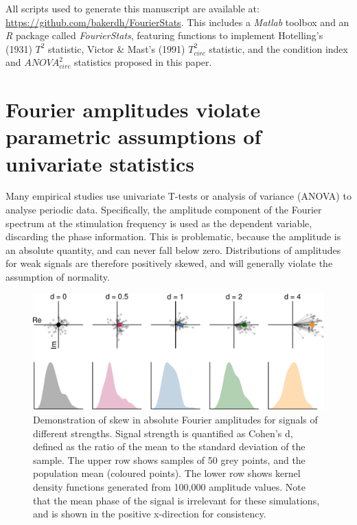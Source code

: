 \documentclass[]{article}
\begin{document}
All scripts used to generate this manuscript are available at: \url{https://github.com/bakerdh/FourierStats}. This includes a \emph{Matlab} toolbox and an \emph{R} package called \emph{FourierStats}, featuring functions to implement Hotelling's (1931) \(T^2\) statistic, Victor \& Mast's (1991) \(T^2_{circ}\) statistic, and the condition index and \(ANOVA^2_{circ}\) statistics proposed in this paper.

\hypertarget{fourier-amplitudes-violate-parametric-assumptions-of-univariate-statistics}{%
\section{Fourier amplitudes violate parametric assumptions of univariate statistics}\label{fourier-amplitudes-violate-parametric-assumptions-of-univariate-statistics}}

Many empirical studies use univariate T-tests or analysis of variance (ANOVA) to analyse periodic data. Specifically, the amplitude component of the Fourier spectrum at the stimulation frequency is used as the dependent variable, discarding the phase information. This is problematic, because the amplitude is an absolute quantity, and can never fall below zero. Distributions of amplitudes for weak signals are therefore positively skewed, and will generally violate the assumption of normality.

\begin{figure}

{\centering \includegraphics{manuscript_files/figure-latex/amphists-1} 

}

\caption{Demonstration of skew in absolute Fourier amplitudes for signals of different strengths. Signal strength is quantified as Cohen's d, defined as the ratio of the mean to the standard deviation of the sample. The upper row shows samples of 50 grey points, and the population mean (coloured points). The lower row shows kernel density functions generated from 100,000 amplitude values. Note that the mean phase of the signal is irrelevant for these simulations, and is shown in the positive x-direction for consistency.}\label{fig:amphists}
\end{figure}
\end{document}
